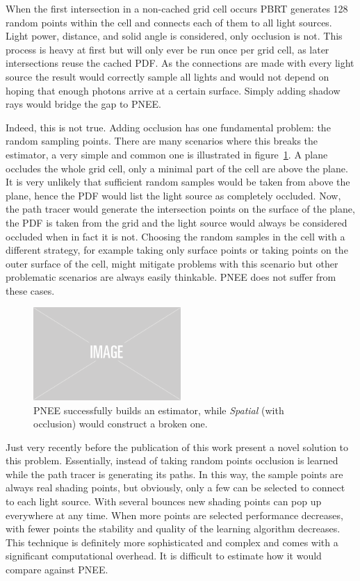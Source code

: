 When the first intersection in a non-cached grid cell occurs PBRT generates 128 random points within the cell and connects each of them to all light sources. Light power, distance, and solid angle is considered, only occlusion is not. This process is heavy at first but will only ever be run once per grid cell, as later intersections reuse the cached PDF. As the connections are made with every light source the result would correctly sample all lights and would not depend on hoping that enough photons arrive at a certain surface. Simply adding shadow rays would bridge the gap to PNEE.

Indeed, this is not true. Adding occlusion has one fundamental problem: the random sampling points. There are many scenarios where this breaks the estimator, a very simple and common one is illustrated in figure~\ref{fig:pbrtoccl}. A plane occludes the whole grid cell, only a minimal part of the cell are above the plane. It is very unlikely that sufficient random samples would be taken from above the plane, hence the PDF would list the light source as completely occluded. Now, the path tracer would generate the intersection points on the surface of the plane, the PDF is taken from the grid and the light source would always be considered occluded when in fact it is not. Choosing the random samples in the cell with a different strategy, for example taking only surface points or taking points on the outer surface of the cell, might mitigate problems with this scenario but other problematic scenarios are always easily thinkable. PNEE does not suffer from these cases.

\begin{figure}
    \centering
    \includegraphics[width=0.5\textwidth]{figures/img-placeholder.png}
    \caption{PNEE successfully builds an estimator, while \textit{Spatial} (with occlusion) would construct a broken one.}
    \label{fig:pbrtoccl}
\end{figure}

Just very recently before the publication of this work \textcite{Vevoda:2018:BOR} present a novel solution to this problem. Essentially, instead of taking random points occlusion is learned while the path tracer is generating its paths. In this way, the sample points are always real shading points, but obviously, only a few can be selected to connect to each light source. With several bounces new shading points can pop up everywhere at any time. When more points are selected performance decreases, with fewer points the stability and quality of the learning algorithm decreases. This technique is definitely more sophisticated and complex and comes with a significant computational overhead. It is difficult to estimate how it would compare against PNEE.